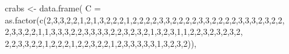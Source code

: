 \documentclass[
  letterpaper,
  DIV=11,
  numbers=noendperiod]{scrartcl}
\newenvironment{Shaded}{\begin{snugshade}}{\end{snugshade}}
\newcommand{\AttributeTok}[1]{\textcolor[rgb]{0.40,0.45,0.13}{#1}}
\newcommand{\DecValTok}[1]{\textcolor[rgb]{0.68,0.00,0.00}{#1}}
\newcommand{\FunctionTok}[1]{\textcolor[rgb]{0.28,0.35,0.67}{#1}}
\newcommand{\NormalTok}[1]{\textcolor[rgb]{0.00,0.23,0.31}{#1}}
\newcommand{\OtherTok}[1]{\textcolor[rgb]{0.00,0.23,0.31}{#1}}
\begin{document}
\begin{Shaded}
\begin{Highlighting}[]
\NormalTok{crabs }\OtherTok{\textless{}{-}} \FunctionTok{data.frame}\NormalTok{(}
  \AttributeTok{C =} \FunctionTok{as.factor}\NormalTok{(}\FunctionTok{c}\NormalTok{(}\DecValTok{2}\NormalTok{,}\DecValTok{3}\NormalTok{,}\DecValTok{3}\NormalTok{,}\DecValTok{2}\NormalTok{,}\DecValTok{2}\NormalTok{,}\DecValTok{1}\NormalTok{,}\DecValTok{2}\NormalTok{,}\DecValTok{1}\NormalTok{,}\DecValTok{3}\NormalTok{,}\DecValTok{2}\NormalTok{,}\DecValTok{2}\NormalTok{,}\DecValTok{2}\NormalTok{,}\DecValTok{1}\NormalTok{,}\DecValTok{2}\NormalTok{,}\DecValTok{2}\NormalTok{,}\DecValTok{2}\NormalTok{,}\DecValTok{2}\NormalTok{,}\DecValTok{3}\NormalTok{,}\DecValTok{3}\NormalTok{,}\DecValTok{2}\NormalTok{,}\DecValTok{2}\NormalTok{,}\DecValTok{2}\NormalTok{,}\DecValTok{2}\NormalTok{,}\DecValTok{3}\NormalTok{,}\DecValTok{3}\NormalTok{,}\DecValTok{2}\NormalTok{,}\DecValTok{2}\NormalTok{,}\DecValTok{2}\NormalTok{,}\DecValTok{2}\NormalTok{,}\DecValTok{3}\NormalTok{,}\DecValTok{3}\NormalTok{,}\DecValTok{3}\NormalTok{,}\DecValTok{2}\NormalTok{,}\DecValTok{3}\NormalTok{,}\DecValTok{2}\NormalTok{,}\DecValTok{2}\NormalTok{,}
        \DecValTok{2}\NormalTok{,}\DecValTok{3}\NormalTok{,}\DecValTok{3}\NormalTok{,}\DecValTok{2}\NormalTok{,}\DecValTok{2}\NormalTok{,}\DecValTok{1}\NormalTok{,}\DecValTok{1}\NormalTok{,}\DecValTok{3}\NormalTok{,}\DecValTok{3}\NormalTok{,}\DecValTok{3}\NormalTok{,}\DecValTok{2}\NormalTok{,}\DecValTok{2}\NormalTok{,}\DecValTok{3}\NormalTok{,}\DecValTok{3}\NormalTok{,}\DecValTok{3}\NormalTok{,}\DecValTok{3}\NormalTok{,}\DecValTok{2}\NormalTok{,}\DecValTok{2}\NormalTok{,}\DecValTok{3}\NormalTok{,}\DecValTok{2}\NormalTok{,}\DecValTok{3}\NormalTok{,}\DecValTok{2}\NormalTok{,}\DecValTok{1}\NormalTok{,}\DecValTok{3}\NormalTok{,}\DecValTok{2}\NormalTok{,}\DecValTok{3}\NormalTok{,}\DecValTok{1}\NormalTok{,}\DecValTok{1}\NormalTok{,}\DecValTok{2}\NormalTok{,}\DecValTok{2}\NormalTok{,}\DecValTok{3}\NormalTok{,}\DecValTok{2}\NormalTok{,}\DecValTok{3}\NormalTok{,}\DecValTok{2}\NormalTok{,}\DecValTok{3}\NormalTok{,}\DecValTok{2}\NormalTok{,}
        \DecValTok{2}\NormalTok{,}\DecValTok{2}\NormalTok{,}\DecValTok{3}\NormalTok{,}\DecValTok{3}\NormalTok{,}\DecValTok{2}\NormalTok{,}\DecValTok{2}\NormalTok{,}\DecValTok{1}\NormalTok{,}\DecValTok{2}\NormalTok{,}\DecValTok{2}\NormalTok{,}\DecValTok{2}\NormalTok{,}\DecValTok{1}\NormalTok{,}\DecValTok{2}\NormalTok{,}\DecValTok{2}\NormalTok{,}\DecValTok{3}\NormalTok{,}\DecValTok{2}\NormalTok{,}\DecValTok{2}\NormalTok{,}\DecValTok{1}\NormalTok{,}\DecValTok{2}\NormalTok{,}\DecValTok{3}\NormalTok{,}\DecValTok{3}\NormalTok{,}\DecValTok{3}\NormalTok{,}\DecValTok{3}\NormalTok{,}\DecValTok{3}\NormalTok{,}\DecValTok{1}\NormalTok{,}\DecValTok{3}\NormalTok{,}\DecValTok{2}\NormalTok{,}\DecValTok{3}\NormalTok{,}\DecValTok{2}\NormalTok{)),}

\end{Highlighting}
\end{Shaded}
\end{document}
